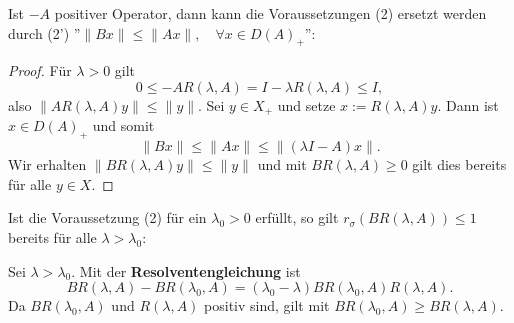 \begin{bem}\label{stärkere Annahme (2)}
Ist $-A$ positiver Operator, dann kann die Voraussetzungen (2) ersetzt werden durch (2') ''$\|Bx\|\leq \|Ax\|,\quad \forall x\in D(A)_+$'':
\par

\end{bem}

\begin{proof}
\par
Für $\lambda >0$ gilt
\begin{equation*}
0\leq -AR(\lambda, A)=I-\lambda R(\lambda, A)\leq I,
\end{equation*}
also $\|AR(\lambda, A)y\|\leq\|y\|$. Sei $y\in X_+$ und setze $x:=R(\lambda, A)y$. Dann ist $x\in D(A)_+$ und somit \begin{equation*}
\|Bx\|\leq \|Ax\|\leq \|(\lambda I-A)x\|.    
\end{equation*}
Wir erhalten $\|BR(\lambda, A)y\|\leq \|y\|$ und mit $BR(\lambda, A)\geq0$ gilt dies bereits für alle $y\in X$. 
\end{proof}

\begin{bem}\label{BR(lambda, A) fallend}
Ist die Voraussetzung (2) für ein $\lambda_0>0$ erfüllt, so gilt $r_\sigma(BR(\lambda, A))\leq1$ bereits für alle $\lambda > \lambda_0$:
\par
Sei $\lambda > \lambda_0$. Mit der \index{}\textbf{Resolventengleichung} ist
\begin{equation*}
BR(\lambda, A)-BR(\lambda_0, A)=(\lambda_0 - \lambda)BR(\lambda_0, A)R(\lambda, A).
\end{equation*}
Da $BR(\lambda_0, A)$ und $R(\lambda,A)$ positiv sind, gilt mit   $BR(\lambda_0, A)\geq BR(\lambda,A)$.
\end{bem}

